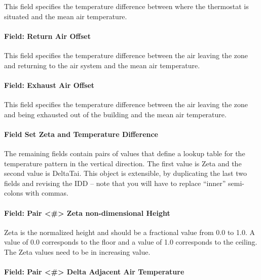 This field specifies the temperature difference between where the thermostat is situated and the mean air temperature.

\paragraph{Field: Return Air Offset}\label{field-return-air-offset-1}

This field specifies the temperature difference between the air leaving the zone and returning to the air system and the mean air temperature.

\paragraph{Field: Exhaust Air Offset}\label{field-exhaust-air-offset-1}

This field specifies the temperature difference between the air leaving the zone and being exhausted out of the building and the mean air temperature.

\paragraph{Field Set Zeta and Temperature Difference}\label{field-set-zeta-and-temperature-difference}

The remaining fields contain pairs of values that define a lookup table for the temperature pattern in the vertical direction. The first value is Zeta and the second value is DeltaTai. This object is extensible, by duplicating the last two fields and revising the IDD -- note that you will have to replace ``inner'' semi-colons with commas.

\paragraph{Field: Pair \textless{}\#\textgreater{} Zeta non-dimensional Height}\label{field-pair-zeta-non-dimensional-height}

Zeta is the normalized height and should be a fractional value from 0.0 to 1.0. A value of 0.0 corresponds to the floor and a value of 1.0 corresponds to the ceiling. The Zeta values need to be in increasing value.

\paragraph{Field: Pair \textless{}\#\textgreater{} Delta Adjacent Air Temperature}\label{field-pair-delta-adjacent-air-temperature}

